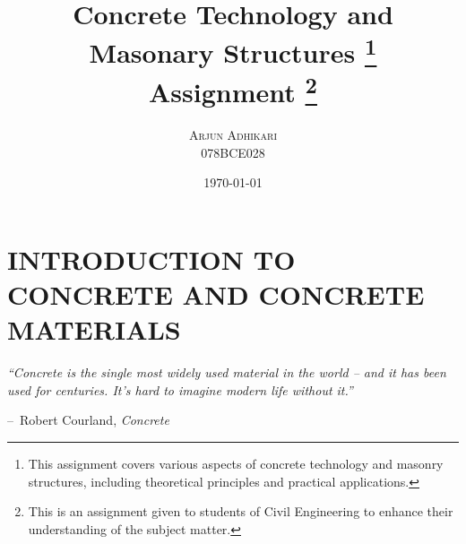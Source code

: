 \documentclass[a4paper,11pt]{book}
\begin{document}
\makeatletter
\renewcommand{\@chapapp}{}%
\newenvironment{chapquote}[2][2em]
  {\setlength{\@tempdima}{#1}%
   \def\chapquote@author{#2}%
   \parshape 1 \@tempdima \dimexpr\textwidth-2\@tempdima\relax%
   \itshape}
  {\par\normalfont\hfill--\ \chapquote@author\hspace*{\@tempdima}\par\bigskip}
\makeatother


\title{\Huge \textbf{Concrete Technology and Masonary Structures}  \footnote{This assignment covers various aspects of concrete technology and masonry structures, including theoretical principles and practical applications.} \\ \huge Assignment \footnote{This is an assignment given to students of Civil Engineering to enhance their understanding of the subject matter.}}
\author{\textsc{Arjun Adhikari} \\ 078BCE028}

\date{\today} %

\maketitle

\tableofcontents

\listoffigures

\listoftables

\mainmatter

\chapter{INTRODUCTION TO CONCRETE AND CONCRETE MATERIALS}
\begin{chapquote}{Robert Courland, \textit{Concrete}}
``Concrete is the single most widely used material in the world – and it has been used for centuries. It's hard to imagine modern life without it.''
\end{chapquote}
\end{document}
